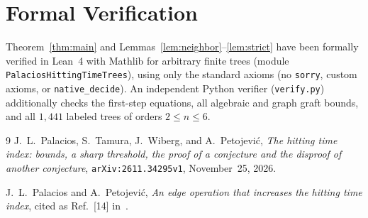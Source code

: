 \documentclass[11pt]{article}
\begin{document}
\section{Formal Verification}

Theorem~\ref{thm:main} and Lemmas~\ref{lem:neighbor}--\ref{lem:strict} have been formally verified in Lean~4 with Mathlib for arbitrary finite trees (module \texttt{PalaciosHittingTimeTrees}), using only the standard axioms (no \texttt{sorry}, custom axioms, or \texttt{native\_decide}). An independent Python verifier (\texttt{verify.py}) additionally checks the first-step equations, all algebraic and graph graft bounds, and all $1{,}441$ labeled trees of orders $2 \le n \le 6$.

\begin{thebibliography}{9}
J.~L.~Palacios, S.~Tamura, J.~Wiberg, and A.~Petojevi\'c,
\emph{The hitting time index: bounds, a sharp threshold, the proof of a conjecture and the disproof of another conjecture},
\texttt{arXiv:2611.34295v1}, November~25, 2026.

J.~L.~Palacios and A.~Petojevi\'c,
\emph{An edge operation that increases the hitting time index},
cited as Ref.~[14] in~\cite{Palacios2026}.
\end{thebibliography}
\end{document}
